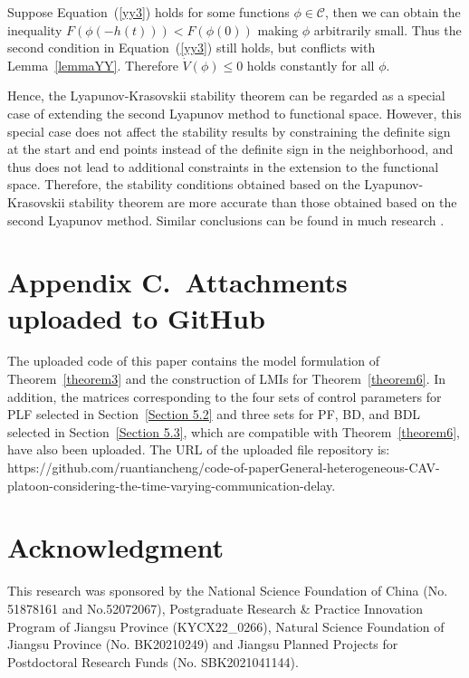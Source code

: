 \documentclass[a4paper]{cas-sc}
\begin{document}
Suppose Equation~(\ref{yy3}) holds for some functions $\phi\in\mathcal{C}$, then we can obtain the inequality $F\left(\phi\left(-h\left(t\right)\right)\right)<F\left(\phi\left(0\right)\right)$ making $\phi$ arbitrarily small. Thus the second condition in Equation~(\ref{yy3}) still holds, but conflicts with Lemma~\ref{lemmaYY}. Therefore $\dot{V}\left(\phi\right)\le0$ holds constantly for all $\phi$.

Hence, the Lyapunov-Krasovskii stability theorem can be regarded as a special case of extending the second Lyapunov method to functional space. However, this special case does not affect the stability results by constraining the definite sign at the start and end points instead of the definite sign in the neighborhood, and thus does not lead to additional constraints in the extension to the functional space. Therefore, the stability conditions obtained based on the Lyapunov-Krasovskii stability theorem are more accurate than those obtained based on the second Lyapunov method. Similar conclusions can be found in much research \citep{wang2016fuzzy,lian2020dissipativity}.

\section*{Appendix C.~Attachments uploaded to GitHub}
\label{AppendixB}
The uploaded code of this paper contains the model formulation of Theorem~\ref{theorem3} and the construction of LMIs for Theorem~\ref{theorem6}. In addition, the matrices corresponding to the four sets of control parameters for PLF selected in Section~\ref{Section 5.2} and three sets for PF, BD, and BDL selected in Section~\ref{Section 5.3}, which are compatible with Theorem~\ref{theorem6}, have also been uploaded. The URL of the uploaded file repository is:
https://github.com/ruantiancheng/code-of-paperGeneral-heterogeneous-CAV-platoon-considering-the-time-varying-communication-delay.

\printcredits

\section*{Acknowledgment}

This research was sponsored by the National Science Foundation of China (No. 51878161 and No.52072067), Postgraduate Research \& Practice Innovation Program of Jiangsu Province (KYCX22\_0266), Natural Science Foundation of Jiangsu Province (No. BK20210249) and Jiangsu Planned Projects for Postdoctoral Research Funds (No. SBK2021041144).

% 





\end{document}

